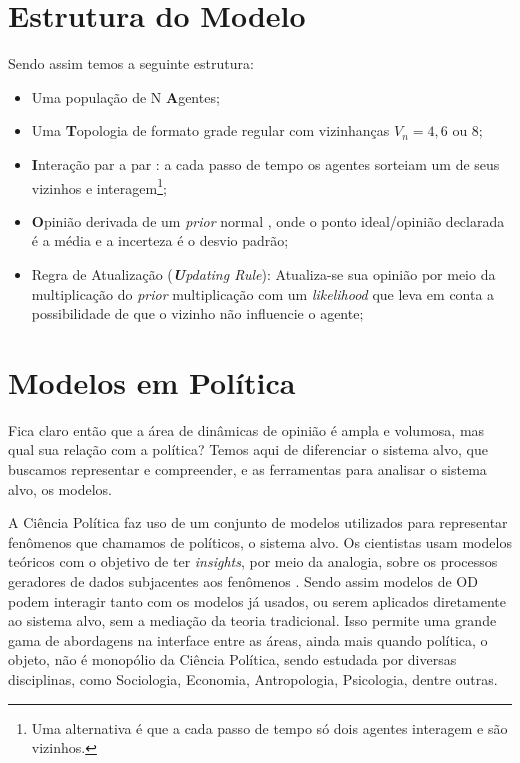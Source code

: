   \section{Estrutura do Modelo}

  Sendo assim temos a seguinte estrutura:

  \begin{itemize}
  \item Uma população de N \textbf{A}gentes;
  \item Uma \textbf{T}opologia de formato grade regular com
    vizinhanças $V_n = 4, 6 \text{ ou } 8 $;
  \item \textbf{I}nteração par a par : a cada passo de tempo os
    agentes sorteiam um de seus vizinhos e interagem\footnote{Uma
      alternativa é que a cada passo de tempo só dois agentes
      interagem e são vizinhos.};
  \item \textbf{O}pinião derivada de um \textit{prior} normal , onde o ponto
    ideal/opinião declarada é a média e a incerteza é o desvio padrão;
  \item Regra de Atualização (\textit{\textbf{U}pdating Rule}):
    Atualiza-se sua opinião por meio da multiplicação do \textit{prior}
    multiplicação com um \textit{likelihood} que leva em conta a
    possibilidade de que o vizinho não influencie o agente;
  \end{itemize}




  
\section{Modelos em Política}

Fica claro então que a área de dinâmicas de opinião é ampla e volumosa, mas qual
sua relação com a política? Temos aqui de diferenciar o sistema alvo, que
buscamos representar e compreender, e as ferramentas para analisar o sistema
alvo, os modelos.


A Ciência Política faz uso de um conjunto de modelos utilizados para representar
fenômenos que chamamos de políticos, o sistema alvo. Os cientistas usam modelos
teóricos com o objetivo de ter \textit{insights}, por meio da analogia, sobre os
processos geradores de dados subjacentes aos fenômenos
\cite{clarke2012model,morton1999methods}. Sendo assim modelos de OD podem
interagir tanto com os modelos já usados, ou serem aplicados diretamente ao
sistema alvo, sem a mediação da teoria tradicional. Isso permite uma grande gama
de abordagens na interface entre as áreas, ainda mais quando política, o objeto,
não é monopólio da Ciência Política, sendo estudada por diversas disciplinas,
como Sociologia, Economia, Antropologia, Psicologia, dentre outras.


